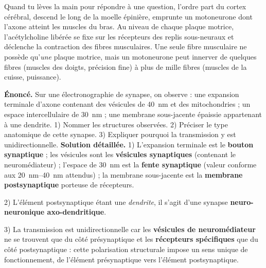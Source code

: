 \documentclass[11pt]{article}
\begin{document}
\begin{exemplebox}
Quand tu lèves la main pour répondre à une question, l'ordre part du cortex cérébral, descend le long de la moelle épinière, emprunte un motoneurone dont l'axone atteint les muscles du bras. Au niveau de chaque plaque motrice, l'acétylcholine libérée se fixe sur les récepteurs des replis sous-neuraux et déclenche la contraction des fibres musculaires. Une seule fibre musculaire ne possède qu'\emph{une} plaque motrice, mais un motoneurone peut innerver de quelques fibres (muscles des doigts, précision fine) à plus de mille fibres (muscles de la cuisse, puissance).
\end{exemplebox}

\begin{exoresolu}
\textbf{Énoncé.} Sur une électronographie de synapse, on observe : une expansion terminale d'axone contenant des vésicules de \SI{40}{\nano\metre} et des mitochondries ; un espace intercellulaire de \SI{30}{\nano\metre} ; une membrane sous-jacente épaissie appartenant à une dendrite. 1) Nommer les structures observées. 2) Préciser le type anatomique de cette synapse. 3) Expliquer pourquoi la transmission y est unidirectionnelle.
\tcblower
\textbf{Solution détaillée.}
1) L'expansion terminale est le \textbf{bouton synaptique} ; les vésicules sont les \textbf{vésicules synaptiques} (contenant le neuromédiateur) ; l'espace de \SI{30}{\nano\metre} est la \textbf{fente synaptique} (valeur conforme aux \SIrange{20}{40}{\nano\metre} attendus) ; la membrane sous-jacente est la \textbf{membrane postsynaptique} porteuse de récepteurs.

2) L'élément postsynaptique étant une \emph{dendrite}, il s'agit d'une synapse \textbf{neuro-neuronique axo-dendritique}.

3) La transmission est unidirectionnelle car les \textbf{vésicules de neuromédiateur} ne se trouvent que du côté présynaptique et les \textbf{récepteurs spécifiques} que du côté postsynaptique : cette polarisation structurale impose un sens unique de fonctionnement, de l'élément présynaptique vers l'élément postsynaptique.
\end{exoresolu}
\end{document}
